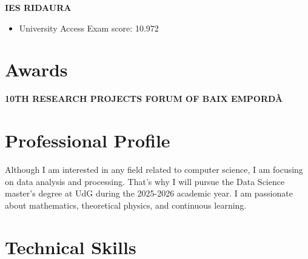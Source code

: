 \documentclass[11pt,a4paper]{article}
\newcommand{\runsubsection}[1]{\color{subheadings}\fontsize{12pt}{12pt}\selectfont\bfseries\uppercase{#1}\normalfont}
\newcommand{\descript}[1]{\color{subheadings}\raggedright\scshape\fontsize{11pt}{13pt}\selectfont{#1 \\}\normalfont}
\newcommand{\location}[1]{\color{headings}\raggedright\fontsize{10pt}{12pt}\selectfont{#1\\}\normalfont}
\newcommand{\sectionsep}{\vspace{8pt}}
\newenvironment{tightemize}{\vspace{-\topsep}\begin{itemize}\itemsep1pt \parskip0pt \parsep0pt}{\end{itemize}\vspace{-\topsep}}
\begin{document}
\begin{multicols}{2}
\runsubsection{IES Ridaura}
\descript{Scientific Baccalaureate}
\location{2019 – 2021 | Castell-Platja d'Aro}
\sectionsep
\begin{tightemize}
\item University Access Exam score: 10.972
\end{tightemize}

\sectionsep

\section{Awards}

\runsubsection{10th Research Projects Forum of Baix Empordà}

\descript{Plaques solars fotovoltaiques, Seguiment solar per millorar-ne el rendiment}
\location{2021 | Girona}
\sectionsep




\columnbreak

\section{Professional Profile}
Although I am interested in any field related to computer science, I am focusing on data analysis and processing. That's why I will pursue the Data Science master's degree at UdG during the 2025-2026 academic year. I am passionate about mathematics, theoretical physics, and continuous learning.

\sectionsep

\section{Technical Skills}


\end{multicols}
\end{document}
